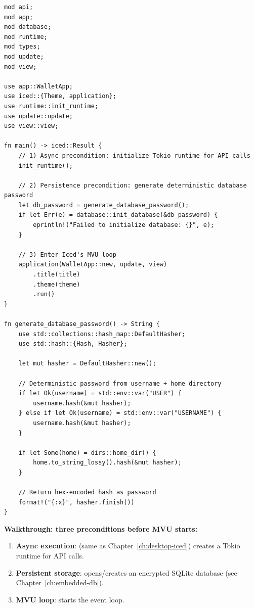 \begin{listing}[H]
\caption{Main entrypoint ()}
\label{lst:ch18-main}
\begin{verbatim}
mod api;
mod app;
mod database;
mod runtime;
mod types;
mod update;
mod view;

use app::WalletApp;
use iced::{Theme, application};
use runtime::init_runtime;
use update::update;
use view::view;

fn main() -> iced::Result {
    // 1) Async precondition: initialize Tokio runtime for API calls
    init_runtime();

    // 2) Persistence precondition: generate deterministic database password
    let db_password = generate_database_password();
    if let Err(e) = database::init_database(&db_password) {
        eprintln!("Failed to initialize database: {}", e);
    }

    // 3) Enter Iced's MVU loop
    application(WalletApp::new, update, view)
        .title(title)
        .theme(theme)
        .run()
}

fn generate_database_password() -> String {
    use std::collections::hash_map::DefaultHasher;
    use std::hash::{Hash, Hasher};

    let mut hasher = DefaultHasher::new();

    // Deterministic password from username + home directory
    if let Ok(username) = std::env::var("USER") {
        username.hash(&mut hasher);
    } else if let Ok(username) = std::env::var("USERNAME") {
        username.hash(&mut hasher);
    }

    if let Some(home) = dirs::home_dir() {
        home.to_string_lossy().hash(&mut hasher);
    }

    // Return hex-encoded hash as password
    format!("{:x}", hasher.finish())
}
\end{verbatim}
\end{listing}

\textbf{Walkthrough: three preconditions before MVU starts:}

\begin{enumerate}
  \item \textbf{Async execution}:  (same as Chapter~\ref{ch:desktop-iced}) creates a Tokio runtime for API calls.
  \item \textbf{Persistent storage}:  opens/creates an encrypted SQLite database (see Chapter~\ref{ch:embedded-db}).
  \item \textbf{MVU loop}:  starts the event loop.
\end{enumerate}

